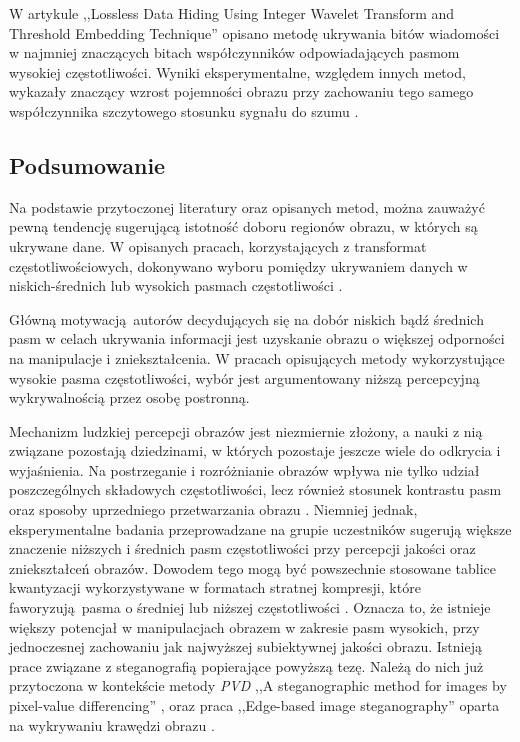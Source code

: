 {{{            W artykule ,,Lossless Data Hiding Using Integer Wavelet Transform and Threshold Embedding
            Technique'' opisano metodę ukrywania bitów wiadomości w najmniej znaczących bitach współczynników
            odpowiadających pasmom wysokiej częstotliwości. Wyniki eksperymentalne, względem innych metod, wykazały
            znaczący wzrost pojemności obrazu przy zachowaniu tego samego współczynnika szczytowego stosunku sygnału do
            szumu \cite{Xuan2005LosslessDH}.}

        \subsection{Podsumowanie}
        {
            Na podstawie przytoczonej literatury oraz opisanych metod, można zauważyć pewną tendencję sugerującą
            istotność doboru regionów obrazu, w których są ukrywane dane. W opisanych pracach, korzystających z
            transformat częstotliwościowych, dokonywano wyboru pomiędzy ukrywaniem danych w
            niskich-średnich \cite{Huang2000EmbeddingIW, DataHidinginJPEG, Li2007ASM} lub wysokich pasmach
            częstotliwości \cite{Xuan2005LosslessDH, Muhuri2020ANI}.

            Główną motywacją autorów decydujących się na dobór niskich bądź średnich pasm w celach ukrywania informacji
            jest uzyskanie obrazu o większej odporności na manipulacje i zniekształcenia. W pracach opisujących metody
            wykorzystujące wysokie pasma częstotliwości, wybór jest argumentowany niższą percepcyjną wykrywalnością
            przez osobę postronną.

            Mechanizm ludzkiej percepcji obrazów jest niezmiernie złożony, a nauki z nią związane pozostają dziedzinami,
            w których pozostaje jeszcze wiele do odkrycia i wyjaśnienia. Na postrzeganie i rozróżnianie obrazów wpływa
            nie tylko udział poszczególnych składowych częstotliwości, lecz również stosunek kontrastu pasm oraz sposoby
            uprzedniego przetwarzania obrazu \cite{Perfetto2020EffectsOS}. Niemniej jednak, eksperymentalne badania
            przeprowadzane na grupie uczestników sugerują większe znaczenie niższych i średnich pasm częstotliwości przy
            percepcji jakości oraz zniekształceń obrazów. Dowodem tego mogą być powszechnie stosowane tablice
            kwantyzacji wykorzystywane w formatach stratnej kompresji, które faworyzują pasma o średniej lub niższej
            częstotliwości \cite{ImageCompressionDCT}. Oznacza to, że istnieje większy potencjał w manipulacjach obrazem
            w zakresie pasm wysokich, przy jednoczesnej zachowaniu jak najwyższej subiektywnej jakości obrazu. Istnieją
            prace związane z steganografią popierające powyższą tezę. Należą do nich już przytoczona w kontekście metody
            \textit{PVD} ,,A steganographic method for images by pixel-value differencing'' \cite{Wu2003ASM}, oraz praca
            ,,Edge-based image steganography'' oparta na wykrywaniu krawędzi obrazu \cite{Islam2014EdgebasedIS}.}}}

